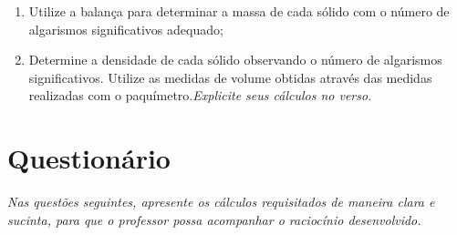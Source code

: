 \begin{enumerate}
     \item Utilize a balança para determinar a massa de cada sólido com o número de algarismos significativos adequado;
     \item Determine a densidade de cada sólido observando o número de algarismos significativos. Utilize as medidas de volume obtidas através das medidas realizadas com o paquímetro.\emph{Explicite seus cálculos no verso}.
\end{enumerate}

\cleardoublepage


\vspace{15mm}

\begin{fullwidth}
\noindent{}
\vspace{5mm}

\noindent{}

\noindent{}

\noindent{}

\noindent{}

\noindent{}
\end{fullwidth}

\vspace{5mm}

\section{Questionário}
\emph{Nas questões seguintes, apresente os cálculos requisitados de maneira clara e sucinta, para que o professor possa acompanhar o raciocínio desenvolvido.}
\vspace{5mm}

